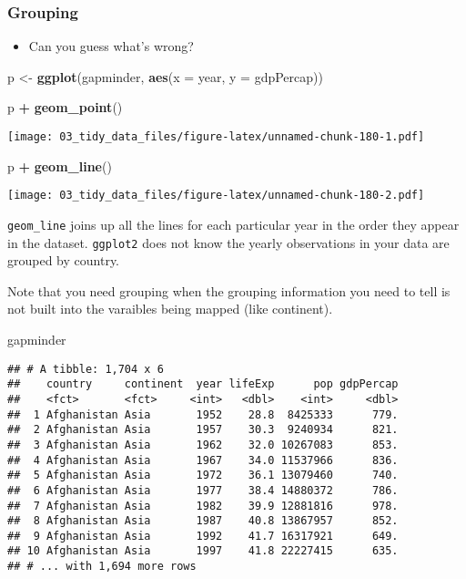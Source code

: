 \documentclass[
]{book}
\newenvironment{Shaded}{\begin{snugshade}}{\end{snugshade}}
\newcommand{\DataTypeTok}[1]{\textcolor[rgb]{0.13,0.29,0.53}{#1}}
\newcommand{\KeywordTok}[1]{\textcolor[rgb]{0.13,0.29,0.53}{\textbf{#1}}}
\newcommand{\NormalTok}[1]{#1}
\newcommand{\OperatorTok}[1]{\textcolor[rgb]{0.81,0.36,0.00}{\textbf{#1}}}
\newcommand{\StringTok}[1]{\textcolor[rgb]{0.31,0.60,0.02}{#1}}
\providecommand{\tightlist}{%
  \setlength{\itemsep}{0pt}\setlength{\parskip}{0pt}}
\begin{document}
\hypertarget{grouping-1}{%
\subsubsection{Grouping}\label{grouping-1}}

\begin{itemize}
\tightlist
\item
  Can you guess what's wrong?
\end{itemize}

\begin{Shaded}
\begin{Highlighting}[]
\NormalTok{p \textless{}{-}}\StringTok{ }\KeywordTok{ggplot}\NormalTok{(gapminder, }\KeywordTok{aes}\NormalTok{(}\DataTypeTok{x =}\NormalTok{ year, }\DataTypeTok{y =}\NormalTok{ gdpPercap))}

\NormalTok{p }\OperatorTok{+}\StringTok{ }\KeywordTok{geom\_point}\NormalTok{()}
\end{Highlighting}
\end{Shaded}

\texttt{[image: 03\_tidy\_data\_files/figure-latex/unnamed-chunk-180-1.pdf]}

\begin{Shaded}
\begin{Highlighting}[]
\NormalTok{p }\OperatorTok{+}\StringTok{ }\KeywordTok{geom\_line}\NormalTok{()}
\end{Highlighting}
\end{Shaded}

\texttt{[image: 03\_tidy\_data\_files/figure-latex/unnamed-chunk-180-2.pdf]}

\texttt{geom\_line} joins up all the lines for each particular year in the order they appear in the dataset. \texttt{ggplot2} does not know the yearly observations in your data are grouped by country.

Note that you need grouping when the grouping information you need to tell is not built into the varaibles being mapped (like continent).

\begin{Shaded}
\begin{Highlighting}[]
\NormalTok{gapminder}
\end{Highlighting}
\end{Shaded}

\begin{verbatim}
## # A tibble: 1,704 x 6
##    country     continent  year lifeExp      pop gdpPercap
##    <fct>       <fct>     <int>   <dbl>    <int>     <dbl>
##  1 Afghanistan Asia       1952    28.8  8425333      779.
##  2 Afghanistan Asia       1957    30.3  9240934      821.
##  3 Afghanistan Asia       1962    32.0 10267083      853.
##  4 Afghanistan Asia       1967    34.0 11537966      836.
##  5 Afghanistan Asia       1972    36.1 13079460      740.
##  6 Afghanistan Asia       1977    38.4 14880372      786.
##  7 Afghanistan Asia       1982    39.9 12881816      978.
##  8 Afghanistan Asia       1987    40.8 13867957      852.
##  9 Afghanistan Asia       1992    41.7 16317921      649.
## 10 Afghanistan Asia       1997    41.8 22227415      635.
## # ... with 1,694 more rows
\end{verbatim}
\end{document}
